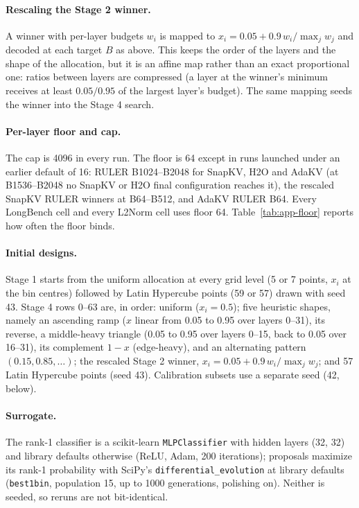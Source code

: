 \paragraph{Rescaling the Stage 2 winner.} A winner with per-layer budgets $w_i$ is mapped to $x_i = 0.05 + 0.9\,w_i / \max_j w_j$ and decoded at each target $B$ as above. This keeps the order of the layers and the shape of the allocation, but it is an affine map rather than an exact proportional one: ratios between layers are compressed (a layer at the winner's minimum receives at least $0.05/0.95$ of the largest layer's budget). The same mapping seeds the winner into the Stage 4 search.

\paragraph{Per-layer floor and cap.} The cap is 4096 in every run. The floor is 64 except in runs launched under an earlier default of 16: RULER B1024--B2048 for SnapKV, H2O and AdaKV (at B1536--B2048 no SnapKV or H2O final configuration reaches it), the rescaled SnapKV RULER winners at B64--B512, and AdaKV RULER B64. Every LongBench cell and every L2Norm cell uses floor 64. Table~\ref{tab:app-floor} reports how often the floor binds.

\paragraph{Initial designs.} Stage 1 starts from the uniform allocation at every grid level (5 or 7 points, $x_i$ at the bin centres) followed by Latin Hypercube points (59 or 57) drawn with seed 43. Stage 4 rows 0--63 are, in order: uniform ($x_i = 0.5$); five heuristic shapes, namely an ascending ramp ($x$ linear from 0.05 to 0.95 over layers 0--31), its reverse, a middle-heavy triangle (0.05 to 0.95 over layers 0--15, back to 0.05 over 16--31), its complement $1-x$ (edge-heavy), and an alternating pattern $(0.15, 0.85, \dots)$; the rescaled Stage 2 winner, $x_i = 0.05 + 0.9\,w_i/\max_j w_j$; and 57 Latin Hypercube points (seed 43). Calibration subsets use a separate seed (42, below).

\paragraph{Surrogate.} The rank-1 classifier is a scikit-learn \texttt{MLPClassifier} with hidden layers (32, 32) and library defaults otherwise (ReLU, Adam, 200 iterations); proposals maximize its rank-1 probability with SciPy's \texttt{differential\_evolution} at library defaults (\texttt{best1bin}, population 15, up to 1000 generations, polishing on). Neither is seeded, so reruns are not bit-identical.

